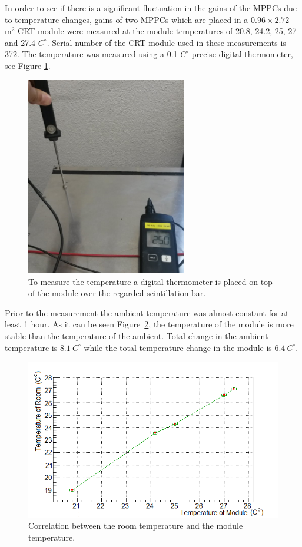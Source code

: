 \documentclass[a4paper]{article}\linespread{1.4}
\begin{document}
In order to see if there is a significant fluctuation in the gains of the MPPCs due to temperature changes, gains of two MPPCs which are placed in a $0.96 \times 2.72$ $\mathrm{m^{2}}$ CRT module were measured at the module temperatures of 20.8, 24.2, 25, 27 and 27.4 $C^{\circ}$. Serial number of the CRT module used in these measurements is 372.
The temperature was measured using a 0.1 $C^{\circ}$ precise digital thermometer, see Figure \ref{fig:term}.
\begin{figure}[] \centering \includegraphics[width=70mm,scale=1.0]{figures/termpaint.png} \caption{To measure the temperature a digital thermometer is placed on top of the module over the regarded scintillation bar.} \label{fig:term} \end{figure}  
Prior to the measurement the ambient temperature was almost constant for at least 1 hour. As it can be seen Figure~\ref{fig:rvsm}, the temperature of the module is more stable than the temperature of the ambient. 
Total change in the ambient temperature is $8.1~C^{\circ}$ while the total temperature change in the module is $6.4~C^{\circ}$.
\begin{figure}[] \centering \includegraphics[width=130mm,scale=1.0]{figures/mea.png} \caption{Correlation between the room temperature and the module temperature.} \label{fig:rvsm} \end{figure}  
\end{document}
